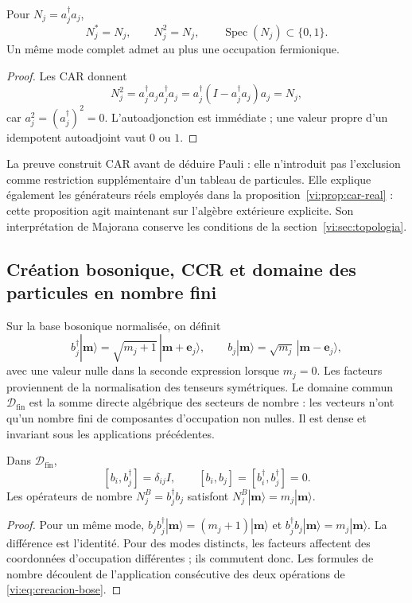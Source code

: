 \begin{corollary}
\label{vi:cor:pauli-ocupacion}
Pour \(N_j=a_j^\dagger a_j\),
\[
 N_j^*=N_j,\qquad N_j^2=N_j,\qquad
 \operatorname{Spec}(N_j)\subset\{0,1\}.
\]
Un même mode complet admet au plus une occupation fermionique.
\end{corollary}
\begin{proof}
Les CAR donnent
\[
 N_j^2=a_j^\dagger a_ja_j^\dagger a_j
 =a_j^\dagger(I-a_j^\dagger a_j)a_j=N_j,
\]
car \(a_j^2=(a_j^\dagger)^2=0\). L’autoadjonction est immédiate ;
une valeur propre d’un idempotent autoadjoint vaut \(0\) ou \(1\).
\end{proof}

La preuve construit CAR avant de déduire Pauli : elle n’introduit pas
l’exclusion comme restriction supplémentaire d’un tableau de particules.
Elle explique également les générateurs réels employés dans la
proposition~\ref{vi:prop:car-real} : cette proposition agit maintenant
sur l’algèbre extérieure explicite. Son interprétation de Majorana
conserve les conditions de la section~\ref{vi:sec:topologia}.

\subsection{Création bosonique, CCR et domaine des particules en nombre fini}
\label{vi:subsec:ccr-construccion}

Sur la base bosonique normalisée, on définit
\begin{equation}
 b_j^\dagger|\boldsymbol m\rangle=
 \sqrt{m_j+1}\,|\boldsymbol m+\boldsymbol e_j\rangle,
 \qquad
 b_j|\boldsymbol m\rangle=
 \sqrt{m_j}\,|\boldsymbol m-\boldsymbol e_j\rangle,
 \label{vi:eq:creacion-bose}
\end{equation}
avec une valeur nulle dans la seconde expression lorsque \(m_j=0\).
Les facteurs proviennent de la normalisation des tenseurs symétriques.
Le domaine commun \(\mathcal D_{\mathrm{fin}}\) est la somme directe
algébrique des secteurs de nombre : les vecteurs n’ont qu’un
nombre fini de composantes d’occupation non nulles. Il est dense et
invariant sous les applications précédentes.

\begin{theorem}
\label{vi:thm:ccr-construidas}
Dans \(\mathcal D_{\mathrm{fin}}\),
\[
 [b_i,b_j^\dagger]=\delta_{ij}I,\qquad
 [b_i,b_j]=[b_i^\dagger,b_j^\dagger]=0.
\]
Les opérateurs de nombre \(N_j^B=b_j^\dagger b_j\) satisfont
\(N_j^B|\boldsymbol m\rangle=m_j|\boldsymbol m\rangle\).
\end{theorem}
\begin{proof}
Pour un même mode,
\(b_jb_j^\dagger|\boldsymbol m\rangle=(m_j+1)|\boldsymbol m\rangle\)
et \(b_j^\dagger b_j|\boldsymbol m\rangle=m_j|\boldsymbol m\rangle\).
La différence est l’identité. Pour des modes distincts, les facteurs
affectent des coordonnées d’occupation différentes ; ils commutent donc.
Les formules de nombre découlent de l’application consécutive des deux
opérations de \eqref{vi:eq:creacion-bose}.
\end{proof}


